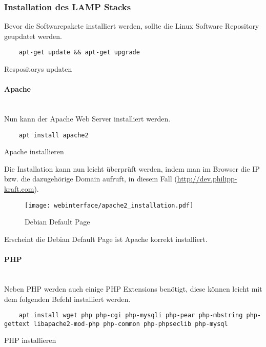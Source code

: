 \subsubsection{Installation des LAMP Stacks}
Bevor die Softwarepakete installiert werden, sollte die Linux Software
Repository geupdatet werden.

\begin{listing}[H]
  \begin{verbatim}
    apt-get update && apt-get upgrade
  \end{verbatim}
  \caption{Respositorys updaten}
\end{listing}

\paragraph{Apache}\mbox{}\\

Nun kann der Apache Web Server installiert werden.

\begin{listing}[H]
  \begin{verbatim}
    apt install apache2
  \end{verbatim}
  \caption{Apache installieren}
\end{listing}

Die Installation kann nun leicht überprüft werden, indem man im Browser die IP
bzw. die dazugehörige Domain aufruft, in diesem Fall (\url{http://dev.philipp-kraft.com}).

\begin{figure}[H]
  \centering
  \texttt{[image: webinterface/apache2\_installation.pdf]}
  \caption{Debian Default Page}
\end{figure}

Erscheint die Debian Default Page ist Apache korrekt installiert.

\paragraph{PHP}\mbox{}\\
Neben PHP werden auch einige PHP Extensions benötigt, diese können leicht mit
dem folgenden Befehl installiert werden.

\begin{listing}[H]
  \begin{verbatim}
    apt install wget php php-cgi php-mysqli php-pear php-mbstring php-gettext libapache2-mod-php php-common php-phpseclib php-mysql
  \end{verbatim}
  \caption{PHP installieren}
\end{listing}

